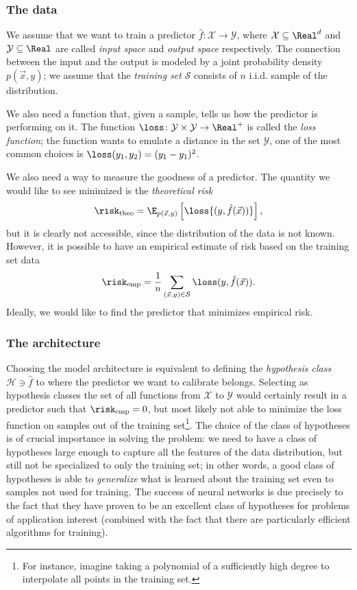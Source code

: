\subsubsection{The data}
We assume that we want to train a predictor \(\hat{f}\colon \mathcal{X}\to\mathcal{Y}\),
where \(\mathcal{X}\subseteq\Real^d\) and \(\mathcal{Y}\subseteq\Real\) are called \emph{input space} and \emph{output space} respectively.
The connection between the input and the output is modeled by a joint probability density \(p(\vec{x},y)\);
we assume that the \emph{training set} \(\mathcal{S}\) consists of \(n\) i.i.d. sample of the distribution.

We also need a function that, given a sample, tells us how the predictor is performing on it.
The function \(\loss\colon\mathcal{Y}\times\mathcal{Y}\to\Real^+\) is called the \emph{loss function};
the function wants to emulate a distance in the set \(\mathcal{Y}\), one of the most common choices is \(\loss(y_1,y_2) = (y_1-y_1)^2\).

We also need a way to measure the goodness of a predictor.
The quantity we would like to see minimized is the \emph{theoretical risk}
\[
  \risk_\text{theo} = \E_{p(\vec{x},y)}\left[\loss{(y,\hat{f}{(\vec{x})})}\right],
\]
but it is clearly not accessible, since the distribution of the data is not known.
However, it is possible to have an empirical estimate of risk based on the training set data
\[
  \risk_\text{emp} = \frac{1}{n}\sum_{(\vec{x},y)\in\mathcal{S}}\loss(y,\hat{f}{(\vec{x})}).
\]
Ideally, we would like to find the predictor that minimizes empirical risk.

\subsubsection{The architecture}
Choosing the model architecture is equivalent to defining the \emph{hypothesis class} \(\mathcal{H}\ni\hat{f}\) to where the predictor we want to calibrate belongs.
Selecting as hypothesis classes the set of all functions from \(\mathcal{X}\) to \(\mathcal{Y}\) would certainly result in a predictor such that \(\risk_\text{emp}=0\),
but most likely not able to minimize the loss function on samples out of the training set\footnote{
  For instance, imagine taking a polynomial of a sufficiently high degree to interpolate all points in the training set.
}. The choice of the class of hypotheses is of crucial importance in solving the problem:
we need to have a class of hypotheses large enough to capture all the features of the data distribution,
but still not be specialized to only the training set; in other words, a good class of hypotheses is able to \emph{generalize}
what is learned about the training set even to samples not used for training.
The success of neural networks is due precisely to the fact that they have proven to be an excellent class of hypotheses for problems of application interest (combined with the fact that there are particularly efficient algorithms for training).

